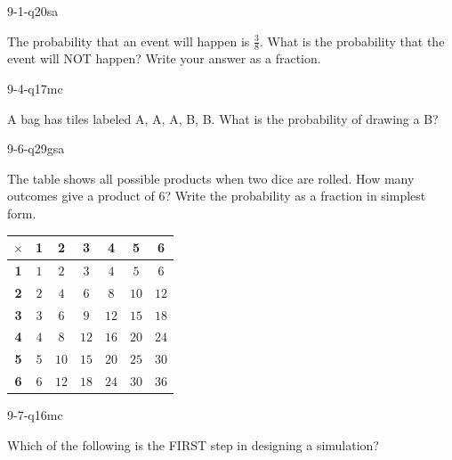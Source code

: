 \begin{practiceQuestion}{9-1-q20}{sa}
\begin{questionText}
The probability that an event will happen is $\frac{3}{8}$. What is the probability that the event will NOT happen? Write your answer as a fraction.
\end{questionText}
\end{practiceQuestion}

\begin{practiceQuestion}{9-4-q17}{mc}
\begin{questionText}
A bag has tiles labeled A, A, A, B, B. What is the probability of drawing a B?
\end{questionText}
\end{practiceQuestion}

\begin{practiceQuestion}{9-6-q29}{gsa}
\begin{questionText}
The table shows all possible products when two dice are rolled. How many outcomes give a product of $6$? Write the probability as a fraction in simplest form.

\begin{center}
\begin{tabular}{|c|c|c|c|c|c|c|}
\hline
$\times$ & \textbf{1} & \textbf{2} & \textbf{3} & \textbf{4} & \textbf{5} & \textbf{6} \\
\hline
\textbf{1} & $1$ & $2$ & $3$ & $4$ & $5$ & $6$ \\
\hline
\textbf{2} & $2$ & $4$ & $6$ & $8$ & $10$ & $12$ \\
\hline
\textbf{3} & $3$ & $6$ & $9$ & $12$ & $15$ & $18$ \\
\hline
\textbf{4} & $4$ & $8$ & $12$ & $16$ & $20$ & $24$ \\
\hline
\textbf{5} & $5$ & $10$ & $15$ & $20$ & $25$ & $30$ \\
\hline
\textbf{6} & $6$ & $12$ & $18$ & $24$ & $30$ & $36$ \\
\hline
\end{tabular}
\end{center}
\end{questionText}
\end{practiceQuestion}

\begin{practiceQuestion}{9-7-q16}{mc}
\begin{questionText}
Which of the following is the FIRST step in designing a simulation?
\end{questionText}
\end{practiceQuestion}
